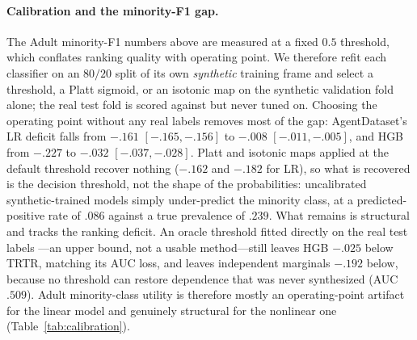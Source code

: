 %
%



\paragraph{Calibration and the minority-F1 gap.} The Adult minority-F1 numbers
above are measured at a fixed $0.5$ threshold, which conflates ranking quality
with operating point. We therefore refit each classifier on an $80/20$ split of
its own \emph{synthetic} training frame and select a threshold, a Platt sigmoid,
or an isotonic map on the synthetic validation fold alone; the real test fold is
scored against but never tuned on. Choosing the operating point without any real
labels removes most of the gap: AgentDataset's LR deficit falls from $-.161$
$[-.165,-.156]$ to $-.008$ $[-.011,-.005]$, and HGB from $-.227$ to $-.032$
$[-.037,-.028]$. Platt and isotonic maps applied at the default threshold recover
nothing ($-.162$ and $-.182$ for LR), so what is recovered is the decision
threshold, not the shape of the probabilities: uncalibrated synthetic-trained
models simply under-predict the minority class, at a predicted-positive rate of
$.086$ against a true prevalence of $.239$. What remains is structural and tracks
the ranking deficit. An oracle threshold fitted directly on the real test labels
---an upper bound, not a usable method---still leaves HGB $-.025$ below TRTR,
matching its AUC loss, and leaves independent marginals $-.192$ below, because no
threshold can restore dependence that was never synthesized (AUC $.509$). Adult
minority-class utility is therefore mostly an operating-point artifact for the
linear model and genuinely structural for the nonlinear one
(Table~\ref{tab:calibration}).


